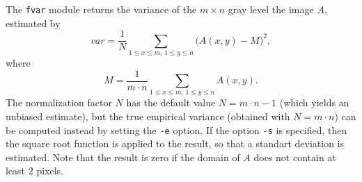 The \verb+fvar+ module returns the variance 
of the $m\times n$ gray level the image $A$, estimated by
$$var = \frac 1N
\sum_{1\leq x \leq m, \,1 \leq y \leq n} \big(A(x,y)-M\big)^2,$$
where
$$M = \frac 1{m \cdot n} 
\sum_{1\leq x \leq m, \,1 \leq y \leq n} A(x,y).$$
The normalization factor $N$ has the default value $N=m \cdot n-1$
(which yields an unbiased estimate), but the true empirical variance
(obtained with $N=m \cdot n$) can be computed instead by setting the 
\verb+-e+ option.
If the option \verb+-s+ is specified, then the square root function
is applied to the result, so that a standart deviation is estimated.
Note that the result is zero if the domain of $A$ does not contain at least
2 pixels.
